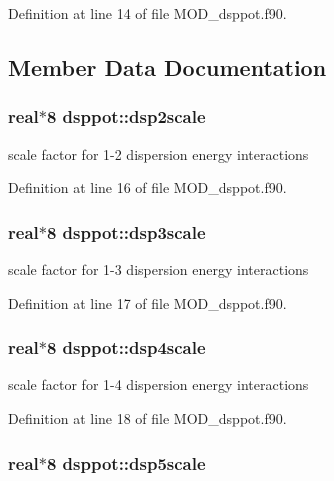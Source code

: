 Definition at line 14 of file M\-O\-D\-\_\-dsppot.\-f90.



\subsection{Member Data Documentation}
\hypertarget{classdsppot_a2c9d8ffce51120f361337e58240dba93}{
\subsubsection[{dsp2scale}]{\setlength{\rightskip}{0pt plus 5cm}real$\ast$8 dsppot\-::dsp2scale}}\label{classdsppot_a2c9d8ffce51120f361337e58240dba93}


scale factor for 1-\/2 dispersion energy interactions 



Definition at line 16 of file M\-O\-D\-\_\-dsppot.\-f90.

\hypertarget{classdsppot_a895607cab88f1962d1354901bc8a23db}{
\subsubsection[{dsp3scale}]{\setlength{\rightskip}{0pt plus 5cm}real$\ast$8 dsppot\-::dsp3scale}}\label{classdsppot_a895607cab88f1962d1354901bc8a23db}


scale factor for 1-\/3 dispersion energy interactions 



Definition at line 17 of file M\-O\-D\-\_\-dsppot.\-f90.

\hypertarget{classdsppot_a422ba96af8ba6bf83f0d53462fb82984}{
\subsubsection[{dsp4scale}]{\setlength{\rightskip}{0pt plus 5cm}real$\ast$8 dsppot\-::dsp4scale}}\label{classdsppot_a422ba96af8ba6bf83f0d53462fb82984}


scale factor for 1-\/4 dispersion energy interactions 



Definition at line 18 of file M\-O\-D\-\_\-dsppot.\-f90.

\hypertarget{classdsppot_a515456a9c4b0342a8e81a2b4b66521ae}{
\subsubsection[{dsp5scale}]{\setlength{\rightskip}{0pt plus 5cm}real$\ast$8 dsppot\-::dsp5scale}}\label{classdsppot_a515456a9c4b0342a8e81a2b4b66521ae}


